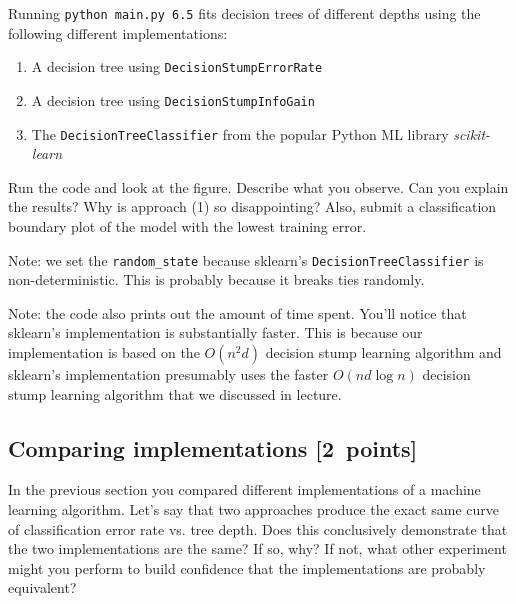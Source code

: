 \documentclass{article}
\newcommand{\blu}[1]{{\textcolor{blu}{#1}}}
\let\ask\blu
\newcommand\pts[1]{\textcolor{pointscolour}{[#1~points]}}
\begin{document}
  Running \texttt{python main.py 6.5} fits decision trees of different depths using the following different implementations:
  \begin{enumerate}
  \item A decision tree using \texttt{DecisionStumpErrorRate}
  \item A decision tree using \texttt{DecisionStumpInfoGain}
  \item The \texttt{DecisionTreeClassifier} from the popular Python ML library \emph{scikit-learn}
  \end{enumerate}

  Run the code and look at the figure.
  \ask{Describe what you observe. Can you explain the results?} Why is approach (1) so disappointing? Also, \ask{submit a classification boundary plot of the model with the lowest training error}.

  Note: we set the \verb|random_state| because sklearn's \texttt{DecisionTreeClassifier} is non-deterministic. This is probably
  because it breaks ties randomly.

  Note: the code also prints out the amount of time spent. You'll notice that sklearn's implementation is substantially faster. This is because
  our implementation is based on the $O(n^2d)$ decision stump learning algorithm and sklearn's implementation presumably uses the faster $O(nd\log n)$
  decision stump learning algorithm that we discussed in lecture.

  \subsection{Comparing implementations \pts{2}}

  In the previous section you compared different implementations of a machine learning algorithm. Let's say that two
  approaches produce the exact same curve of classification error rate vs. tree depth. Does this conclusively demonstrate
  that the two implementations are the same? If so, why? If not, what other experiment might you perform to build confidence
  that the implementations are probably equivalent?
\end{document}
